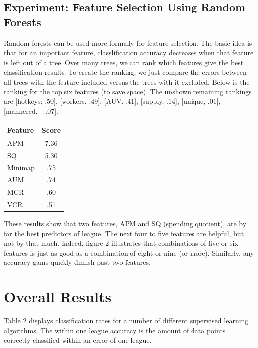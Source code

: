 \documentclass{article} %
\begin{document}
\subsection{Experiment: Feature Selection Using Random Forests}

Random forests can be used more formally for feature selection. The basic idea is that for an important feature, classlification accuracy decreases when that feature is left out of a tree. Over many trees, we can rank which features give the best classification results. To create the ranking, we just compare the errors between all trees with the feature included versus the trees with it excluded. Below is the ranking for the top six features (to save space). The unshown remaining rankings are [hotkeys: \(.50\)], [workers, .\(49\)], [AUV, \(.41\)], [supply, \(.14\)], [unique, \(.01\)], [mannered, \(-.07\)]. 


\begin{center}
\begin{table}[H]
    \begin{tabular}{|l|c|}
    \hline
    \textbf{Feature}  &\textbf{Score} \\ \hline
    APM      & 7.36  \\ \hline
    SQ       & 5.30  \\ \hline
    Minimap  & .75   \\ \hline
    AUM      & .74   \\ \hline
    MCR      & .60   \\ \hline
    VCR      & .51   \\ \hline
    \end{tabular}
\end{table}
\end{center}

These results show that two features, APM and SQ (spending quotient), are by far the best predictors of league. The next four to five features are helpful, but not by that much. Indeed, figure 2 illustrates that combinations of five or six features is just as good as a combination of eight or nine (or more). Similarly, any accuracy gains quickly dimish past two features. 

  



\section{Overall Results} 

Table 2 displays classification rates for a number of different supervised learning algorithms. The within one league accuracy is the amount of data points correctly classified within an error of one league. 
\end{document}
